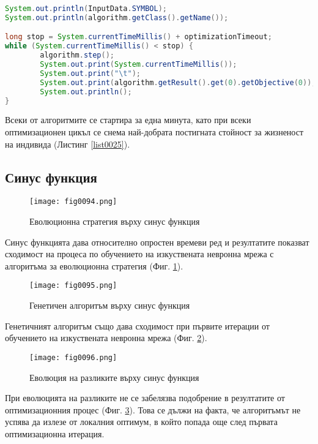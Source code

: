 \begin{lstlisting}[caption=Отчитане на междинните стойности в процеса по оптимизация, language=Java, basicstyle=\tiny, label=list0025]
System.out.println(InputData.SYMBOL);
System.out.println(algorithm.getClass().getName());

long stop = System.currentTimeMillis() + optimizationTimeout;
while (System.currentTimeMillis() < stop) {
        algorithm.step();
        System.out.print(System.currentTimeMillis());
        System.out.print("\t");
        System.out.print(algorithm.getResult().get(0).getObjective(0));
        System.out.println();
}
\end{lstlisting}

Всеки от алгоритмите се стартира за една минута, като при всеки оптимизационен цикъл се снема най-добрата постигната стойност за жизненост на индивида (Листинг \ref{list0025}).

\subsection{Синус функция}

\begin{figure}[H]
  \centering
  \texttt{[image: fig0094.png]}
  \caption{Еволюционна стратегия върху синус функция}
\label{fig0094}
\end{figure}

Синус функцията дава относително опростен времеви ред и резултатите показват сходимост на процеса по обучението на изкуствената невронна мрежа с алгоритъма за еволюционна стратегия (Фиг. \ref{fig0094}).

\newpage

\begin{figure}[H]
  \centering
  \texttt{[image: fig0095.png]}
  \caption{Генетичен алгоритъм върху синус функция}
\label{fig0095}
\end{figure}

Генетичният алгоритъм също дава сходимост при първите итерации от обучението на изкуствената невронна мрежа (Фиг. \ref{fig0095}).

\begin{figure}[H]
  \centering
  \texttt{[image: fig0096.png]}
  \caption{Еволюция на разликите върху синус функция}
\label{fig0096}
\end{figure}

При еволюцията на разликите не се забелязва подобрение в резултатите от оптимизационния процес (Фиг. \ref{fig0096}). Това се дължи на факта, че алгоритъмът не успява да излезе от локалния оптимум, в който попада още след първата оптимизационна итерация. 

